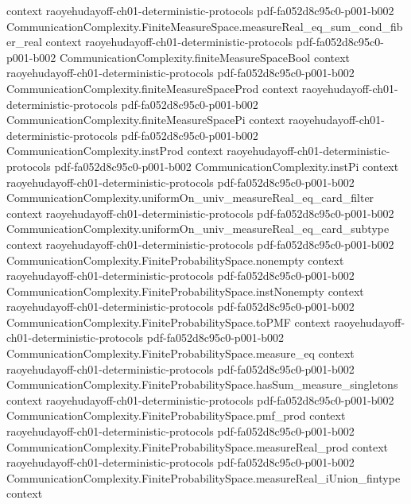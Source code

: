 \begin{theorem}
  {context}
  {raoyehudayoff-ch01-deterministic-protocols}
  {pdf-fa052d8c95c0-p001-b002}
\proofstep
  {CommunicationComplexity.FiniteMeasureSpace.measureReal_eq_sum_cond_fiber_real}
  {context}
  {raoyehudayoff-ch01-deterministic-protocols}
  {pdf-fa052d8c95c0-p001-b002}
\proofstep
  {CommunicationComplexity.finiteMeasureSpaceBool}
  {context}
  {raoyehudayoff-ch01-deterministic-protocols}
  {pdf-fa052d8c95c0-p001-b002}
\proofstep
  {CommunicationComplexity.finiteMeasureSpaceProd}
  {context}
  {raoyehudayoff-ch01-deterministic-protocols}
  {pdf-fa052d8c95c0-p001-b002}
\proofstep
  {CommunicationComplexity.finiteMeasureSpacePi}
  {context}
  {raoyehudayoff-ch01-deterministic-protocols}
  {pdf-fa052d8c95c0-p001-b002}
\proofstep
  {CommunicationComplexity.instProd}
  {context}
  {raoyehudayoff-ch01-deterministic-protocols}
  {pdf-fa052d8c95c0-p001-b002}
\proofstep
  {CommunicationComplexity.instPi}
  {context}
  {raoyehudayoff-ch01-deterministic-protocols}
  {pdf-fa052d8c95c0-p001-b002}
\proofstep
  {CommunicationComplexity.uniformOn_univ_measureReal_eq_card_filter}
  {context}
  {raoyehudayoff-ch01-deterministic-protocols}
  {pdf-fa052d8c95c0-p001-b002}
\proofstep
  {CommunicationComplexity.uniformOn_univ_measureReal_eq_card_subtype}
  {context}
  {raoyehudayoff-ch01-deterministic-protocols}
  {pdf-fa052d8c95c0-p001-b002}
\proofstep
  {CommunicationComplexity.FiniteProbabilitySpace.nonempty}
  {context}
  {raoyehudayoff-ch01-deterministic-protocols}
  {pdf-fa052d8c95c0-p001-b002}
\proofstep
  {CommunicationComplexity.FiniteProbabilitySpace.instNonempty}
  {context}
  {raoyehudayoff-ch01-deterministic-protocols}
  {pdf-fa052d8c95c0-p001-b002}
\proofstep
  {CommunicationComplexity.FiniteProbabilitySpace.toPMF}
  {context}
  {raoyehudayoff-ch01-deterministic-protocols}
  {pdf-fa052d8c95c0-p001-b002}
\proofstep
  {CommunicationComplexity.FiniteProbabilitySpace.measure_eq}
  {context}
  {raoyehudayoff-ch01-deterministic-protocols}
  {pdf-fa052d8c95c0-p001-b002}
\proofstep
  {CommunicationComplexity.FiniteProbabilitySpace.hasSum_measure_singletons}
  {context}
  {raoyehudayoff-ch01-deterministic-protocols}
  {pdf-fa052d8c95c0-p001-b002}
\proofstep
  {CommunicationComplexity.FiniteProbabilitySpace.pmf_prod}
  {context}
  {raoyehudayoff-ch01-deterministic-protocols}
  {pdf-fa052d8c95c0-p001-b002}
\proofstep
  {CommunicationComplexity.FiniteProbabilitySpace.measureReal_prod}
  {context}
  {raoyehudayoff-ch01-deterministic-protocols}
  {pdf-fa052d8c95c0-p001-b002}
\proofstep
  {CommunicationComplexity.FiniteProbabilitySpace.measureReal_iUnion_fintype}
  {context}

\end{theorem}
